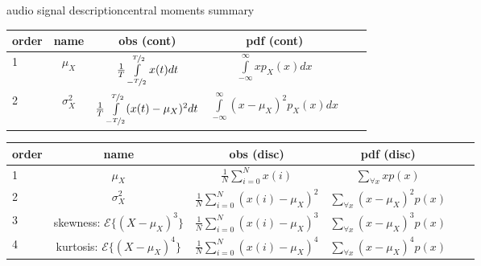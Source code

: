 \begin{frame}{audio signal description}{central moments summary}
    \begin{footnotesize}
     \begin{table}
         \centering
             \begin{tabular}{lccccc}
                 order & name & obs (cont) & pdf (cont) & \\\hline
                1 & $\mu_X$ & $\frac{1}{T}\int\limits_{-\nicefrac{T}{2}}^{\nicefrac{T}{2}} x(t)dt$ & $\int\limits_{-\infty}^{\infty}{xp_X(x)dx}$  \\
                2 & $\sigma_X^2$ & $\frac{1}{T}\int\limits_{-\nicefrac{T}{2}}^{\nicefrac{T}{2}}(x(t)-\mu_X)^2dt$ & $\int\limits_{-\infty}^{\infty} (x-\mu_X)^2p_X(x)dx$  \\
             \end{tabular}
     \end{table}
     \begin{table}
         \centering
             \begin{tabular}{lccccc}
                 order & name  & obs (disc) & pdf (disc)\\\hline
                1 & $\mu_X$         &  $\frac{1}{N}\sum\limits_{i=0}^{N} x(i)$              & $\sum\limits_{\forall x} x p(x)$ \\
                2 & $\sigma_X^2$    &  $\frac{1}{N}\sum\limits_{i=0}^{N} (x(i)-\mu_X)^2$    & $\sum\limits_{\forall x} (x-\mu_X)^2p(x)$ \\
                3 & skewness: $\mathcal{E}\lbrace  (X-\mu_X)^3\rbrace$ & $\frac{1}{N}\sum\limits_{i=0}^{N} (x(i)-\mu_X)^3$ & $\sum\limits_{\forall x} (x-\mu_X)^3p(x)$ &\\
                4 & kurtosis: $\mathcal{E}\lbrace  (X-\mu_X)^4\rbrace$ & $\frac{1}{N}\sum\limits_{i=0}^{N} (x(i)-\mu_X)^4$ & $\sum\limits_{\forall x} (x-\mu_X)^4p(x)$ &\\
             \end{tabular}
     \end{table}
    \end{footnotesize}
\end{frame}		


